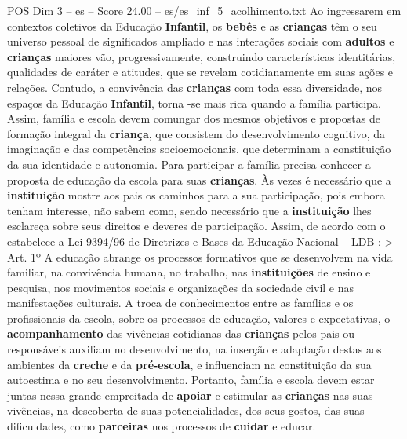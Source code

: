 \begin{textsample}{POS Dim 3 – es – Score 24.00 – es/es\_inf\_5\_acolhimento.txt}
Ao ingressarem em contextos coletivos da Educação \textbf{Infantil}, os \textbf{bebês} e as \textbf{crianças} têm o seu universo pessoal de significados ampliado e nas interações sociais com \textbf{adultos} e \textbf{crianças} maiores vão, progressivamente, construindo características identitárias, qualidades de caráter e atitudes, que se revelam cotidianamente em suas ações e relações.
Contudo, a convivência das \textbf{crianças} com toda essa diversidade, nos espaços da Educação \textbf{Infantil}, torna -se mais rica quando a família participa.
Assim, família e escola devem comungar dos mesmos objetivos e propostas de formação integral da \textbf{criança}, que consistem do desenvolvimento cognitivo, da imaginação e das competências socioemocionais, que determinam a constituição da sua identidade e autonomia.
Para participar a família precisa conhecer a proposta de educação da escola para suas \textbf{crianças}.
Às vezes é necessário que a \textbf{instituição} mostre aos pais os caminhos para a sua participação, pois embora tenham interesse, não sabem como, sendo necessário que a \textbf{instituição} lhes esclareça sobre seus direitos e deveres de participação.
Assim, de acordo com o estabelece a Lei 9394/96 de Diretrizes e Bases da Educação Nacional – LDB : > Art. 1º A educação abrange os processos formativos que se desenvolvem na vida familiar, na convivência humana, no trabalho, nas \textbf{instituições} de ensino e pesquisa, nos movimentos sociais e organizações da sociedade civil e nas manifestações culturais.
A troca de conhecimentos entre as famílias e os profissionais da escola, sobre os processos de educação, valores e expectativas, o \textbf{acompanhamento} das vivências cotidianas das \textbf{crianças} pelos pais ou responsáveis auxiliam no desenvolvimento, na inserção e adaptação destas aos ambientes da \textbf{creche} e da \textbf{pré-escola}, e influenciam na constituição da sua autoestima e no seu desenvolvimento.
Portanto, família e escola devem estar juntas nessa grande empreitada de \textbf{apoiar} e estimular as \textbf{crianças} nas suas vivências, na descoberta de suas potencialidades, dos seus gostos, das suas dificuldades, como \textbf{parceiras} nos processos de \textbf{cuidar} e educar.

\end{textsample}
